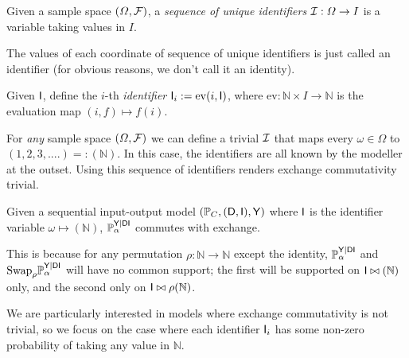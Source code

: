 \begin{definition}
Given a sample space $(\Omega,\mathcal{F})$, a \emph{sequence of unique identifiers} $\mathcal{I}:\Omega\to I$ is a variable taking values in $I$.
\end{definition}

The values of each coordinate of sequence of unique identifiers is just called an identifier (for obvious reasons, we don't call it an identity).

\begin{definition}[Identification]
Given $\mathsf{I}$, define the $i$-th \emph{identifier} $\mathsf{I}_i:=\mathrm{ev}(i,\mathsf{I})$, where $\mathrm{ev}:\mathbb{N}\times I\to \mathbb{N}$ is the evaluation map $(i,f)\mapsto f(i)$.
\end{definition}

For \emph{any} sample space $(\Omega,\mathcal{F})$ we can define a trivial $\mathcal{I}$ that maps every $\omega\in\Omega$ to $(1,2,3,....)=:(\mathbb{N})$. In this case, the identifiers are all known by the modeller at the outset. Using this sequence of identifiers renders exchange commutativity trivial.

\begin{example}\label{eq:il_exchc}
Given a sequential input-output model $(\mathbb{P}_C, (\mathsf{D},\mathsf{I}),\mathsf{Y})$ where $\mathsf{I}$ is the identifier variable $\omega\mapsto (\mathbb{N})$, $\mathbb{P}_\alpha^{\mathsf{Y}|\mathsf{DI}}$ commutes with exchange.

This is because for any permutation $\rho:\mathbb{N}\to\mathbb{N}$ except the identity, $\mathbb{P}_\alpha^{\mathsf{Y}|\mathsf{DI}}$ and $\text{Swap}_{\rho}\mathbb{P}_\alpha^{\mathsf{Y}|\mathsf{DI}}$ will have no common support; the first will be supported on $\mathsf{I}\bowtie (\mathbb{N})$ only, and the second only on $\mathsf{I}\bowtie \rho(\mathbb{N})$.
\end{example}

We are particularly interested in models where exchange commutativity is not trivial, so we focus on the case where each identifier $\mathsf{I}_i$ has some non-zero probability of taking any value in $\mathbb{N}$. 



